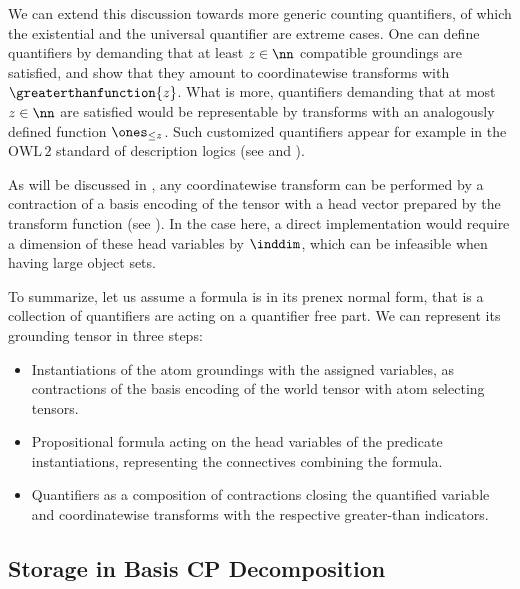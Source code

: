 We can extend this discussion towards more generic counting quantifiers, of which the existential and the universal quantifier are extreme cases.
One can define quantifiers by demanding that at least $z\in\nn$ compatible groundings are satisfied, and show that they amount to coordinatewise transforms with $\greaterthanfunction{z}$.
What is more, quantifiers demanding that at most $z\in\nn$ are satisfied would be representable by transforms with an analogously defined function $\ones_{\leq z}$.
Such customized quantifiers appear for example in the $\mathrm{OWL\,2}$ standard of description logics (see \cite{rudolph_foundations_2011} and ).

As will be discussed in , any coordinatewise transform can be performed by a contraction of a basis encoding of the tensor with a head vector prepared by the transform function (see ).
In the case here, a direct implementation would require a dimension of these head variables by $\inddim$, which can be infeasible when having large object sets.

To summarize, let us assume a formula is in its prenex normal form, that is a collection of quantifiers are acting on a quantifier free part.
We can represent its grounding tensor in three steps:
\begin{itemize}
    \item Instantiations of the atom groundings with the assigned variables, as contractions of the basis encoding of the world tensor with atom selecting tensors.
    \item Propositional formula acting on the head variables of the predicate instantiations, representing the connectives combining the formula.
    \item Quantifiers as a composition of contractions closing the quantified variable and coordinatewise transforms with the respective greater-than indicators.
\end{itemize}

\subsection{Storage in Basis CP Decomposition}\label{sec:basisCPgrounding}

